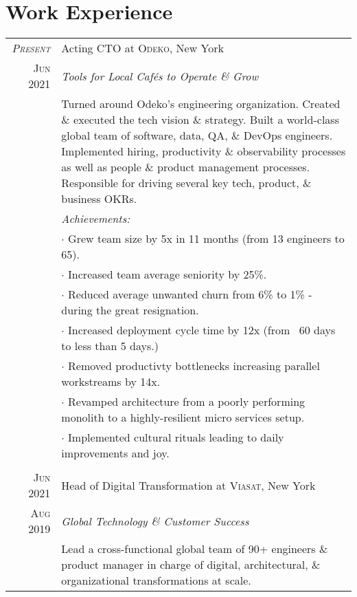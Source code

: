 \documentclass[a4paper,10pt]{article}
\begin{document}
\section{Work Experience}
\begin{tabular}{r|p{14cm}}
  \textsc{\emph{Present}} & Acting CTO at \textsc{Odeko}, New York \\

  \textsc{Jun 2021} & \emph{Tools for Local Caf\'{e}s to Operate \& Grow}\\

  &\footnotesize{Turned around Odeko's engineering
    organization. Created \& executed the tech vision \&
    strategy. Built a world-class global team of software, data, QA,
    \& DevOps engineers. Implemented hiring, productivity \&
    observability processes as well as people \& product management
    processes. Responsible for driving several key tech, product, \&
    business OKRs.}\\

  &\emph{Achievements:}\\

  &$\cdot$ \footnotesize{Grew team size by 5x in 11 months (from 13 engineers to 65).}\\
  &$\cdot$ \footnotesize{Increased team average seniority by 25\%.}\\
  &$\cdot$ \footnotesize{Reduced average unwanted churn from 6\% to 1\% - during the great resignation.}\\
  &$\cdot$ \footnotesize{Increased deployment cycle time by 12x (from ~60 days to less than 5 days.)}\\
  &$\cdot$ \footnotesize{Removed productivty bottlenecks increasing parallel workstreams by 14x.}\\
  &$\cdot$ \footnotesize{Revamped architecture from a poorly performing monolith to a highly-resilient micro services setup.}\\
  &$\cdot$ \footnotesize{Implemented cultural rituals leading to daily improvements and joy.}\\

  \multicolumn{2}{c}{}\\

  \textsc{Jun 2021} & Head of Digital Transformation at \textsc{Viasat}, New York \\

  \textsc{Aug 2019} & \emph{Global Technology \& Customer Success}\\

  &\footnotesize{Lead a cross-functional global team of 90+
    engineers \& product manager in charge of digital, architectural,
    \& organizational transformations at scale.}\\


\end{tabular}
\end{document}
